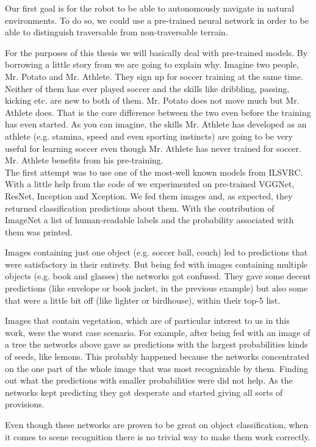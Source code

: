 \documentclass[12pt,a4paper]{report}
\newcommand{\acronym}{\MakeUppercase}
\begin{document}
	
	
	
	
	
	Our first goal is for the robot to be able to autonomously navigate in natural 
	environments. To do so, we could use a pre-trained neural network in order to be 
	able to distinguish traversable from non-traversable terrain.
	\par
	For the purposes of this thesis we will basically deal with pre-trained models. By
	borrowing a little story from \citet{Gupta} we are going to explain why. Imagine two 
	people, Mr. Potato and Mr. Athlete. They sign up for soccer training at the same time. 
	Neither of them has ever played soccer and the skills like dribbling, passing, 
	kicking etc. are new to both of them. Mr. Potato does not move much but Mr. Athlete 
	does. That is the core difference between the two even before the training has even 
	started. As you can imagine, the skills Mr. Athlete has developed as an athlete 
	(e.g. stamina, speed and even sporting instincts) are going to be very useful for 
	learning soccer even though Mr. Athlete has never trained for soccer. Mr. Athlete 
	benefits from his pre-training.
	\\
	
	The first attempt was to use one of the most-well known models from \acronym{ilsvrc}. 
	With a little help from the code of \citet{Rosebrocke} we experimented on 
	pre-trained VGGNet, ResNet, Inception and Xception. We fed them images and, 
	as expected, they returned classification predictions about them. With the 
	contribution of ImageNet a list of human-readable labels and the probability 
	associated with them was printed.
	\par
	Images containing just one object (e.g. soccer ball, couch) led to predictions 
	that were satisfactory in their entirety. But being fed with images containing 
	multiple objects (e.g. book and glasses) the networks got confused. They gave 
	some decent predictions (like envelope or book jacket, in the previous example) 
	but also some that were a little bit off (like lighter or birdhouse), within 
	their top-5 list.
	\par
	Images that contain vegetation, which are of particular interest to us in this 
	work, were the worst case scenario. For example, after being fed with an image 
	of a tree the networks above gave as predictions with the largest probabilities 
	kinds of seeds, like lemons. This probably happened because the networks concentrated 
	on the one part of the whole image that was most recognizable by them. Finding out 
	what the predictions with smaller probabilities were did not help. As the networks 
	kept predicting they got desperate and started giving all sorts of provisions. 
	\par
	Even though these networks are proven to be great on object classification, when 
	it comes to scene recognition there is no trivial way to make them work correctly.
	\\
	
\end{document}
